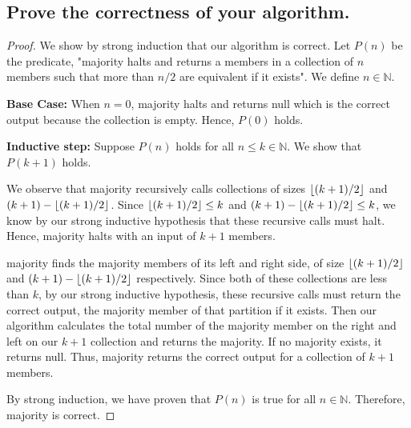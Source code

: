 \documentclass[11pt]{scrartcl}
\begin{document}
\subsection{
	Prove the correctness of your algorithm.
}
\begin{proof}
	We show by strong induction that our algorithm is correct. Let $P(n)$ be the predicate,
	"majority halts and returns a members in a collection of $n$ members
	such that more than $n/2$ are equivalent if it exists". We define $n \in \mathbb{N}$.
	\par \textbf{Base Case:} When $n = 0$, majority halts and returns null which is the correct output
	because the collection is empty. Hence, $P(0)$ holds.
	\par \textbf{Inductive step:} Suppose $P(n)$ holds for all $n \leq k \in \mathbb{N}$. We show that $P(k+1)$ holds.
	\par We observe that majority recursively calls collections of sizes $\left\lfloor (k+1)/2 \right\rfloor$ and
	$(k+1) - \left\lfloor (k+1)/2 \right\rfloor$.
	Since $\left\lfloor (k+1)/2 \right\rfloor \leq k$ and $(k+1) - \left\lfloor (k+1)/2 \right\rfloor \leq k $, we know by our strong inductive hypothesis that these
	recursive calls must halt. Hence, majority halts with an input of $k+1$ members.
	\par majority finds the majority members of its left and right side, of size $\left\lfloor (k+1)/2 \right\rfloor$ and
	$(k+1) - \left\lfloor (k+1)/2 \right\rfloor$ respectively. Since both of these collections are less than $k$, by our strong inductive hypothesis,
	these recursive calls must return the correct output, the majority member of that partition if it exists.
	Then our algorithm calculates the total number of the majority member on the right and left on our
	$k+1$ collection and returns the majority. If no majority exists, it returns null. Thus,
	majority returns the correct output for a collection of $k+1$ members.

	\par By strong induction, we have proven that $P(n)$ is true for all $n \in \mathbb{N}$.
	Therefore, majority is correct.
\end{proof}


\end{document}
